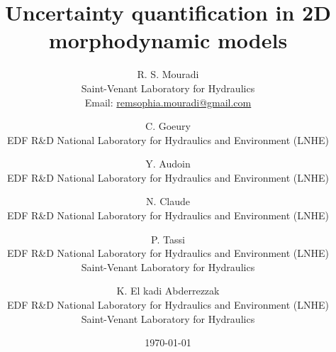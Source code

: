 \documentclass{article}
\begin{document}
\title{Uncertainty quantification in 2D morphodynamic models}
\author{R. S. Mouradi  \\
        Saint-Venant Laboratory for Hydraulics\\
	Email: \href{mailto:remsophia.mouradi@gmail.com}{remsophia.mouradi@gmail.com} \\
	\and 
	C. Goeury \\
	EDF R\&D National Laboratory for Hydraulics and Environment (LNHE)\\
	\and
        Y. Audoin \\
	EDF R\&D National Laboratory for Hydraulics and Environment (LNHE)\\
        \and
        N. Claude\\
	EDF R\&D National Laboratory for Hydraulics and Environment (LNHE)\\
        \and
	P. Tassi \\
        EDF R\&D National Laboratory for Hydraulics and Environment (LNHE)\\
        Saint-Venant Laboratory for Hydraulics\\  
        \and
        K. El kadi Abderrezzak\\
	EDF R\&D National Laboratory for Hydraulics and Environment (LNHE)\\
	Saint-Venant Laboratory for Hydraulics\\   
	}
\date{\today}
\maketitle















\newpage



\end{document}
